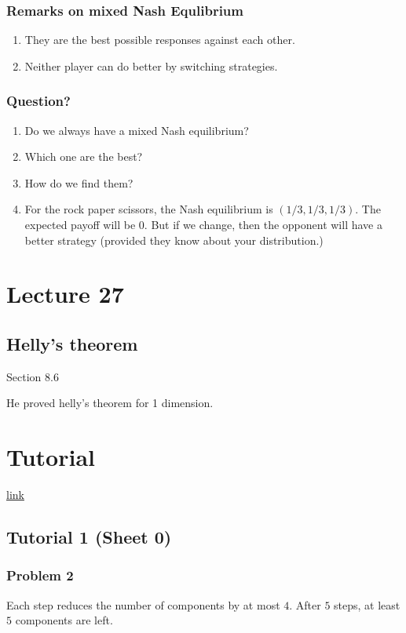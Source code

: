 \documentclass[11pt]{article}
\begin{document}
\subsubsection{Remarks on mixed Nash Equlibrium}
\label{sec:org20e40af}
\begin{enumerate}
\item They are the best possible responses against each other.
\item Neither player can do better by switching strategies.
\end{enumerate}
\subsubsection{Question?}
\label{sec:org53cbb7a}
\begin{enumerate}
\item Do we always have a mixed Nash equilibrium?
\item Which one are the best?
\item How do we find them?
\item For the rock paper scissors, the Nash equilibrium is \((1/3, 1/3, 1/3)\).
The expected payoff will be \(0\). But if we change, then the opponent will
have a better strategy (provided they know about your distribution.)
\end{enumerate}
\section{Lecture 27}
\label{sec:orge7aab01}
\subsection{Helly's theorem}
\label{sec:orgebd5269}
Section 8.6

He proved helly's theorem for 1 dimension.
\section{Tutorial}
\label{sec:orgdc2b885}
\href{http://discretemath.imp.fu-berlin.de/DMII-2018-19/}{link}
\subsection{Tutorial 1 (Sheet 0)}
\label{sec:org2f68a19}
\subsubsection{Problem 2}
\label{sec:orge627e46}
Each step reduces the number of components by at most \(4\). After \(5\) steps, at least \(5\) components are left.
\end{document}
